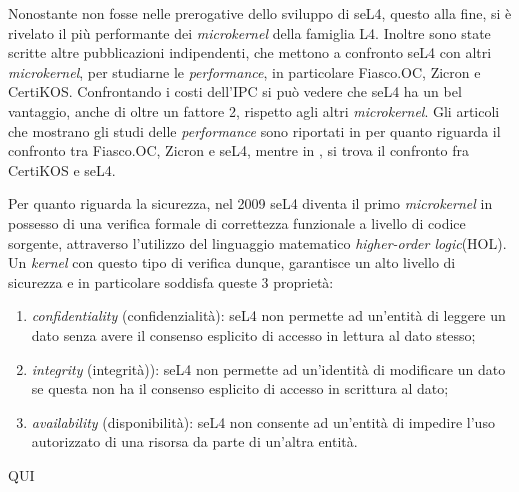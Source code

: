 Nonostante non fosse nelle prerogative dello sviluppo di seL4, questo alla fine, si è rivelato il più performante dei \textit{microkernel} della famiglia L4. Inoltre sono state scritte altre pubblicazioni indipendenti, che mettono a confronto seL4 con altri \textit{microkernel}, per studiarne le \textit{performance}, in particolare Fiasco.OC, Zicron e CertiKOS. Confrontando i costi dell'IPC si può vedere che seL4 ha un bel vantaggio, anche di oltre un fattore 2, rispetto agli altri \textit{microkernel}.
Gli articoli che mostrano gli studi delle \textit{performance} sono riportati in \cite{skybridge} per quanto riguarda il confronto tra Fiasco.OC, Zicron e seL4, mentre in \cite{CertiKOS}, si trova il confronto fra CertiKOS e seL4.

Per quanto riguarda la sicurezza, nel 2009 seL4 diventa il primo \textit{microkernel} in possesso di una verifica formale di correttezza funzionale a livello di codice sorgente, attraverso l'utilizzo del linguaggio matematico \textit{higher-order logic}(HOL). Un \textit{kernel} con questo tipo di verifica dunque, garantisce un alto livello di sicurezza e in particolare soddisfa queste 3 proprietà:
\begin{enumerate}
	\item \textit{confidentiality} (confidenzialità): seL4 non permette ad un'entità di leggere un dato senza avere il consenso esplicito di accesso in lettura al dato stesso;
	\item \textit{integrity} (integrità)): seL4 non permette ad un'identità di modificare un dato se questa non ha il consenso esplicito di accesso in scrittura al dato;
	\item \textit{availability} (disponibilità): seL4 non consente ad un'entità di impedire l'uso autorizzato di una risorsa da parte di un'altra entità.
\end{enumerate}


QUI